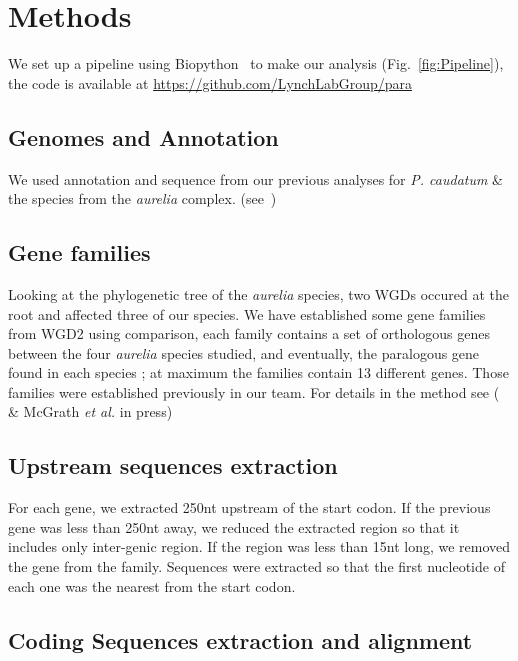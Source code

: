 \section*{Methods}

We set up a pipeline using Biopython~\citep{cock_biopython:_2009} to make our analysis (Fig.~\ref{fig:Pipeline}), the code is available at \url{https://github.com/LynchLabGroup/para}

\subsection*{Genomes and Annotation}

We used annotation and sequence from our previous analyses for \textit{P. caudatum} \& the species from the \textit{aurelia} complex. (see~\citealt{mcgrath_insights_2014})

\subsection*{Gene families}

Looking at the phylogenetic tree of the \textit{aurelia} species, two WGDs occured at the root and affected three of our species. We have established some gene families from WGD2 using comparison, each family contains a set of orthologous genes between the four \textit{aurelia} species studied, and eventually, the paralogous gene found in each species ; at maximum the families contain 13 different genes. Those families were established previously in our team. For details in the method see (~\citealt{mcgrath_insights_2014} \& McGrath \textit{et al.} in press)

\subsection*{Upstream sequences extraction}

For each gene, we extracted 250nt upstream of the start codon. If the previous gene was less than 250nt away, we reduced the extracted region so that it includes only inter-genic region. If the region was less than 15nt long, we removed the gene from the family. Sequences were extracted so that the first nucleotide of each one was the nearest from the start codon.

\subsection*{Coding Sequences extraction and alignment}

